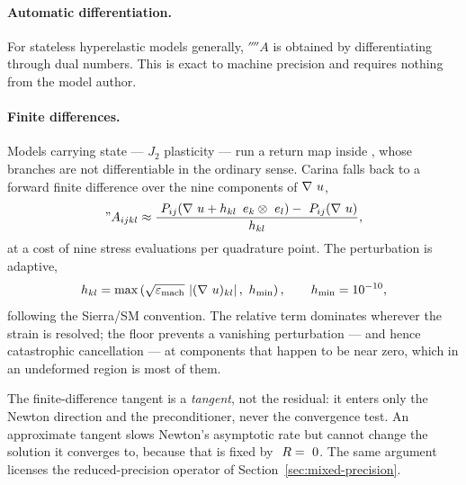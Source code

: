 \paragraph{Automatic differentiation.}  For stateless hyperelastic models
generally, $\fourth{A}$ is obtained by differentiating 
through dual numbers.  This is exact to machine precision and requires nothing
from the model author.

\paragraph{Finite differences.}  Models carrying state --- $J_2$ plasticity ---
run a return map inside , whose branches are not
differentiable in the ordinary sense.  Carina falls back to a forward finite
difference over the nine components of $\nabla~u$,
\begin{equation}
  "A_{ijkl} \approx
  \frac{~P_{ij}(\nabla~u + h_{kl}\,~e_k\otimes~e_l) - ~P_{ij}(\nabla~u)}{h_{kl}},
\end{equation}
at a cost of nine stress evaluations per quadrature point.  The perturbation is
adaptive,
\begin{equation}
  h_{kl} = \max\left(\sqrt{\varepsilon_{\mathrm{mach}}}\,\abs{(\Grad\disp)_{kl}},\ h_{\min}\right),
  \qquad h_{\min} = 10^{-10},
\end{equation}
following the Sierra/SM convention.  The relative term dominates wherever the
strain is resolved; the floor prevents a vanishing perturbation --- and hence
catastrophic cancellation --- at components that happen to be near zero, which
in an undeformed region is most of them.

\begin{remark}
The finite-difference tangent is a \emph{tangent}, not the residual: it enters
only the Newton direction and the preconditioner, never the convergence test.
An approximate tangent slows Newton's asymptotic rate but cannot change the
solution it converges to, because that is fixed by $~R = ~0$.  The
same argument licenses the reduced-precision operator of
Section~\ref{sec:mixed-precision}.
\end{remark}
